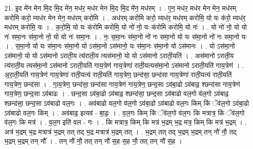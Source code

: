 \documentclass[17pt]{extarticle}
\begin{document}
21. इ॒द मे॑न मेन मि॒द मि॒द मे॑न॒ मध॑र॒ मध॑र मेन मि॒द मि॒द मे॑न॒ मध॑रम् । . ए॒न॒ मध॑र॒ मध॑र मेन मेन॒ मध॑रम् करोमि करो॒ म्यध॑र मेन मेन॒ मध॑रम् करोमि । . अध॑रम् करोमि करो॒ म्यध॑र॒ मध॑रम् करोमि॒ यो यः क॑रो॒ म्यध॑र॒ मध॑रम् करोमि॒ यः । . क॒रो॒मि॒ यो यः क॑रोमि करोमि॒ यो नो॑ नो॒ यः क॑रोमि करोमि॒ यो नः॑ । . यो नो॑ नो॒ यो यो नः॑ समा॒नः स॑मा॒नो नो॒ यो यो नः॑ समा॒नः । . नः॒ स॒मा॒नः स॑मा॒नो नो॑ नः समा॒नो यो यः स॑मा॒नो नो॑ नः समा॒नो यः । . स॒मा॒नो यो यः स॑मा॒नः स॑मा॒नो यो ऽस॑मा॒नो ऽस॑मानो॒ यः स॑मा॒नः स॑मा॒नो यो ऽस॑मानः । . यो ऽस॑मा॒नो ऽस॑मानो॒ यो यो ऽस॑मानो ऽराती॒य त्य॑राती॒य त्यस॑मानो॒ यो यो ऽस॑मानो ऽराती॒यति॑ । . अस॑मानो ऽराती॒य त्य॑राती॒य त्यस॑मा॒नो ऽस॑मानो ऽराती॒यति॑ गाय॒त्रेण॑ गाय॒त्रेणा॑ राती॒यत्यस॑मा॒नो ऽस॑मानो ऽराती॒यति॑ गाय॒त्रेण॑ । . अ॒रा॒ती॒यति॑ गाय॒त्रेण॑ गाय॒त्रेणा॑ राती॒यत्य॑ राती॒यति॑ गाय॒त्रेण॒ छन्द॑सा॒ छन्द॑सा गाय॒त्रेणा॑ राती॒यत्य॑ राती॒यति॑ गाय॒त्रेण॒ छन्द॑सा । . गा॒य॒त्रेण॒ छन्द॑सा॒ छन्द॑सा गाय॒त्रेण॑ गाय॒त्रेण॒ छन्द॒सा ऽव॑बा॒ढो ऽव॑बाढ॒ श्छन्द॑सा गाय॒त्रेण॑ गाय॒त्रेण॒ छन्द॒सा ऽव॑बाढः । . छन्द॒सा ऽव॑बा॒ढो ऽव॑बाढ॒ श्छन्द॑सा॒ छन्द॒सा ऽव॑बाढो वल॒गो व॑ल॒गो ऽव॑बाढ॒ श्छन्द॑सा॒ छन्द॒सा ऽव॑बाढो वल॒गः । . अव॑बाढो वल॒गो व॑ल॒गो ऽव॑बा॒ढो ऽव॑बाढो वल॒गः किम् किं ॅव॑ल॒गो ऽव॑बा॒ढो ऽव॑बाढो वल॒गः किम् । . अव॑बाढ॒ इत्यव॑ - बा॒ढः॒ । . व॒ल॒गः किम् किं ॅव॑ल॒गो व॑ल॒गः कि मत्रात्र॒ किं ॅव॑ल॒गो व॑ल॒गः कि मत्र॑ । . व॒ल॒ग इति॑ वल - गः । . कि मत्रात्र॒ किम् कि मत्र॑ भ॒द्रम् भ॒द्र मत्र॒ किम् कि मत्र॑ भ॒द्रम् । . अत्र॑ भ॒द्रम् भ॒द्र मत्रात्र॑ भ॒द्रम् तत् तद् भ॒द्र मत्रात्र॑ भ॒द्रम् तत् । . भ॒द्रम् तत् तद् भ॒द्रम् भ॒द्रम् तन् नौ॑ नौ॒ तद् भ॒द्रम् भ॒द्रम् तन् नौ᳚ । . तन् नौ॑ नौ॒ तत् तन् नौ॑ स॒ह स॒ह नौ॒ तत् तन् नौ॑ स॒ह । \newline
\end{document}
